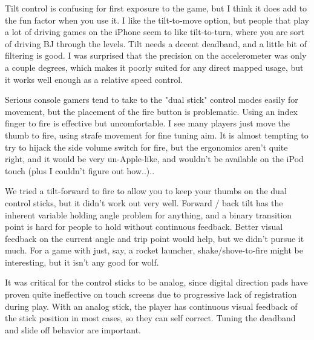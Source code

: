 \documentclass[book.tex]{subfiles}
\begin{document}
Tilt control is confusing for first exposure to the game, but I think it does add to the fun factor when you use it.  I like the tilt-to-move option, but people that play a lot of driving games on the iPhone seem to like tilt-to-turn, where you are sort of driving BJ through the levels.  Tilt needs a decent deadband, and a little bit of filtering is good.  I was surprised that the precision on the accelerometer was only a couple degrees, which makes it poorly suited for any direct mapped usage, but it works well enough as a relative speed control.\\
\par

Serious console gamers tend to take to the "dual stick" control modes easily for movement, but the placement of the fire button is problematic.  Using an index finger to fire is effective but uncomfortable.  I see many players just move the thumb to fire, using strafe movement for fine tuning aim.  It is almost tempting to try to hijack the side volume switch for fire, but the ergonomics aren't quite right, and it would be very un-Apple-like, and wouldn't be available on the iPod touch (plus I couldn't figure out how..)..\\
\par

We tried a tilt-forward to fire to allow you to keep your thumbs on the dual control sticks, but it didn't work out very well.  Forward / back tilt has the inherent variable holding angle problem for anything, and a binary transition point is hard for people to hold without continuous feedback.  Better visual feedback on the current angle and trip point would help, but we didn't pursue it much.  For a game with just, say, a rocket launcher, shake/shove-to-fire might be interesting, but it isn't any good for wolf.\\
\par

It was critical for the control sticks to be analog, since digital direction pads have proven quite ineffective on touch screens due to progressive lack of registration during play.  With an analog stick, the player has continuous visual feedback of the stick position in most cases, so they can self correct.  Tuning the deadband and slide off behavior are important.\\
\par
\end{document}
